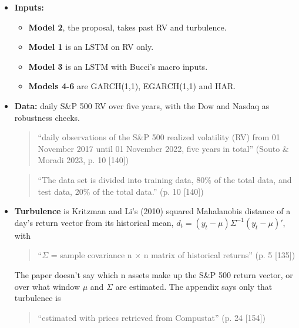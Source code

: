 \documentclass{article}
\begin{document}
\begin{itemize}

\item \textbf{Inputs:}

\begin{itemize}

\item \textbf{Model 2}, the proposal, takes past RV and turbulence.

\item \textbf{Model 1} is an LSTM on RV only.

\item \textbf{Model 3} is an LSTM with Bucci's macro inputs.

\item \textbf{Models 4-6} are GARCH(1,1), EGARCH(1,1) and HAR.

\end{itemize}

\item \textbf{Data:} daily S\&P 500 RV over five years, with the Dow and Nasdaq as robustness checks.

\begin{quote}``daily observations of the S\&P 500 realized volatility (RV) from 01 November 2017 until 01 November 2022, five years in total'' (Souto \& Moradi 2023, p. 10 [140])\end{quote}

\begin{quote}``The data set is divided into training data, 80\% of the total data, and test data, 20\% of the total data.'' (p. 10 [140])\end{quote}

\item \textbf{Turbulence} is Kritzman and Li's (2010) squared Mahalanobis distance of a day's return vector from its historical mean, $d_t = (y_t-\mu)\Sigma^{-1}(y_t-\mu)'$, with

\begin{quote}``\ensuremath{\Sigma} = sample covariance n \ensuremath{\times} n matrix of historical returns'' (p. 5 [135])\end{quote}

The paper doesn't say which n assets make up the S\&P 500 return vector, or over what window $\mu$ and $\Sigma$ are estimated. The appendix says only that turbulence is

\begin{quote}``estimated with prices retrieved from Compustat'' (p. 24 [154])\end{quote}

\end{itemize}
\end{document}
